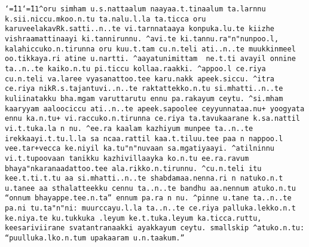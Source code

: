 \bigskip

{\raggedright\tt\catcode`\^=11\catcode`\~=11\dollar ^oru simham u.s.nattaalum naayaa.t.tinaalum ta.larnnu k.sii.niccu.mkoo.n.tu
ta.nalu.l.la ta.ticca oru karuveelakavRk.satti..n..te vi.tarnnataaya konpuka.lu.te
kiizhe vishraamattinaayi ki.tannirunnu. ^avi.te ki.tannu.ra"n"nunpoo.l,
kalahiccuko.n.tirunna oru kuu.t.tam cu.n.teli ati..n..te muukkinmeel
oo.tikkaya.ri atine u.nartti. ^aayatunimittam ~ne.t.ti avayil onnine ta..n..te
kaiko.n.tu pi.ticcu kollaa.raakki. ^appoo.l ce.riya cu.n.teli va.laree
vyasanattoo.tee karu.nakk apeek.siccu. ^itra ce.riya nikR.s.tajantuvi..n..te
raktattekko.n.tu si.mhatti..n..te kuliinatakku bha.mgam varuttarutu ennu pa.rakayum
ceytu. ^si.mham kaaryyam aaloociccu ati..n..te apeek.sapoolee ceyyunnataa.nu+
yoogyata ennu ka.n.tu+ vi.raccuko.n.tirunna ce.riya ta.tavukaarane k.sa.nattil
vi.t.tuka.la~n~nu. ^ee.ra kaalam kazhiyum munpee ta..n..te irekkaayi.t.tu.l.la
sa~ncaa.rattil kaa.t.tiluu.tee paa~n~nappoo.l vee.tar+vecca ke.niyil
ka.tu"n"nuvaan sa.mgatiyaayi. ^atilninnu vi.t.tupoovaan tanikku kazhivillaayka
ko.n.tu ee.ra.ravum bhaya"nkaranaadattoo.tee ala.rikko.n.tirunnu.
^cu.n.teli itu kee.t.ti.t.tu aa si.mhatti..n..te shabdamaa.nenna.ri~n~natuko.n.t
u.tanee aa sthalatteekku cennu ta..n..te bandhu aa.nennum atuko.n.tu
``onnum bhayappe.tee.n.ta'' ennum pa.ra~n~nu. ^pinne u.tane
ta..n..te pa.ni tu.ta"n"ni: muurccayu.l.la ta..n..te ce.riya palluka.lekko.n.t
ke.niya.te ku.tukkuka .leyum ke.t.tuka.leyum ka.ticca.ruttu, keesariviirane
svatantranaakki ayakkayum ceytu.
\smallskip
\bslash smallskip
\smallskip
^atuko.n.tu: ``puulluka.l{}ko.n.tum upakaaram u.n.taakum.''
\dollar
}
\endinput

